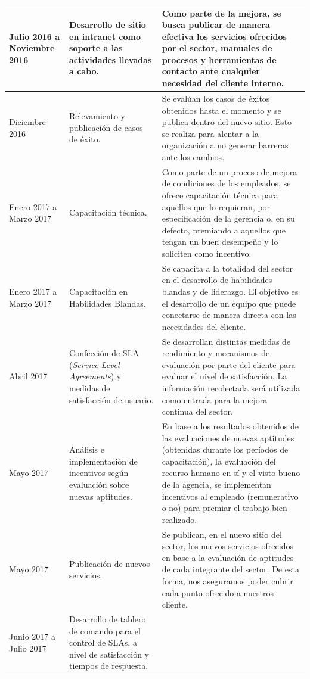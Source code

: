 \begin{center}
\begin{longtable}{|>{\centering\arraybackslash}m{3cm}|>{\centering\arraybackslash}m{3cm}|m{7cm}|}
\hline
Julio 2016 a Noviembre 2016
&
Desarrollo de sitio en intranet como soporte a las actividades llevadas a cabo.
&
Como parte de la mejora, se busca publicar de manera efectiva los servicios ofrecidos por el sector, manuales de procesos y herramientas de contacto ante cualquier necesidad del cliente interno.
\\
\hline
Diciembre 2016
&
Relevamiento y publicación de casos de éxito.
&
Se evalúan los casos de éxitos obtenidos hasta el momento y se publica dentro del nuevo sitio. Esto se realiza para alentar a la organización a no generar barreras ante los cambios.
\\
\hline
Enero 2017 a Marzo 2017
&
Capacitación técnica.
&
Como parte de un proceso de mejora de condiciones de los empleados, se ofrece capacitación técnica para aquellos que lo requieran, por especificación de la gerencia o, en su defecto, premiando a aquellos que tengan un buen desempeño y lo soliciten como incentivo.
\\
\hline
Enero 2017 a Marzo 2017
&
Capacitación en Habilidades Blandas.
&
Se capacita a la totalidad del sector en el desarrollo de habilidades blandas y de liderazgo. El objetivo es el desarrollo de un equipo que puede conectarse de manera directa con las necesidades del cliente.
\\
\hline
Abril 2017
&
Confección de SLA (\textit{Service Level Agreements}) y medidas de satisfacción de usuario.
&
Se desarrollan distintas medidas de rendimiento y mecanismos de evaluación por parte del cliente para evaluar el nivel de satisfacción. La información recolectada será utilizada como entrada para la mejora continua del sector.
\\
\hline
Mayo 2017
&
Análisis e implementación de incentivos según evaluación sobre nuevas aptitudes.
&
En base a los resultados obtenidos de las evaluaciones de nuevas aptitudes (obtenidas durante los períodos de capacitación), la evaluación del recurso humano en sí y el visto bueno de la agencia, se implementan incentivos al empleado (remunerativo o no) para premiar el trabajo bien realizado.
\\
\hline
Mayo 2017
&
Publicación de nuevos servicios.
&
Se publican, en el nuevo sitio del sector, los nuevos servicios ofrecidos en base a la evaluación de aptitudes de cada integrante del sector. De esta forma, nos aseguramos poder cubrir cada punto ofrecido a nuestros cliente.
\\
\hline
Junio 2017 a Julio 2017
&
Desarrollo de tablero de comando para el control de SLAs, a nivel de satisfacción y tiempos de respuesta.

\end{longtable}
\end{center}
